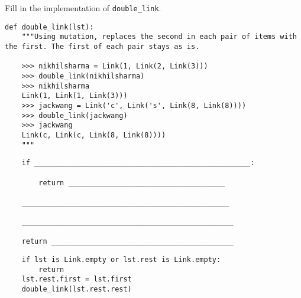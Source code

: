 \begin{blocksection}
\question Fill in the implementation of \lstinline$double_link$.

\begin{lstlisting}
def double_link(lst):
    """Using mutation, replaces the second in each pair of items with the first. The first of each pair stays as is.

    >>> nikhilsharma = Link(1, Link(2, Link(3)))
    >>> double_link(nikhilsharma)
    >>> nikhilsharma
    Link(1, Link(1, Link(3)))
    >>> jackwang = Link('c', Link('s', Link(8, Link(8))))
    >>> double_link(jackwang)
    >>> jackwang
    Link(c, Link(c, Link(8, Link(8))))
    """
\end{lstlisting}

\ifprintanswers\else
\begin{lstlisting}
    if ___________________________________________________:

        return _____________________________________

    _________________________________________________

    __________________________________________________

    return ___________________________________________
\end{lstlisting}
\fi

\begin{solution}
\begin{lstlisting}
    if lst is Link.empty or lst.rest is Link.empty:
        return
    lst.rest.first = lst.first
    double_link(lst.rest.rest)
\end{lstlisting}
\end{solution}
\end{blocksection}
